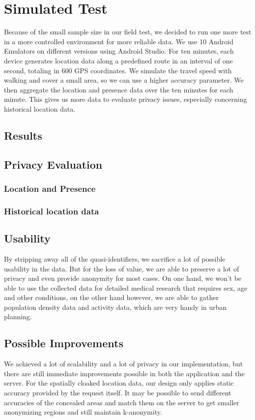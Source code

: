 \section{Simulated Test}
Because of the small sample size in our field test, we decided to run one more test in a more controlled environment for more reliable data. We use 10 Android Emulators on different versions using Android Studio. For ten minutes, each device generates location data along a predefined route in an interval of one second, totaling in 600 GPS coordinates. We simulate the travel speed with walking and cover a small area, so we can use a higher accuracy parameter. We then aggregate the location and presence data over the ten minutes for each minute. This gives us more data to evaluate privacy issues, especially concerning historical location data.

\subsection{Results}
\subsection{Privacy Evaluation}
\subsubsection{Location and Presence}
\subsubsection{Historical location data}
\subsection{Usability}
By stripping away all of the quasi-identifiers, we sacrifice a lot of possible usability in the data. But for the loss of value, we are able to preserve a lot of privacy and even provide anonymity for most cases. On one hand, we won't be able to use the collected data for detailed medical research that requires sex, age and other conditions, on the other hand however, we are able to gather population density data and activity data, which are very handy in urban planning.
\subsection{Possible Improvements}
We achieved a lot of scalability and a lot of privacy in our implementation, but there are still immediate improvements possible in both the application and the server. For the spatially cloaked location data, our design only applies static accuracy provided by the request itself. It may be possible to send different accuracies of the concealed areas and match them on the server to get smaller anonymizing regions and still maintain k-anonymity.

